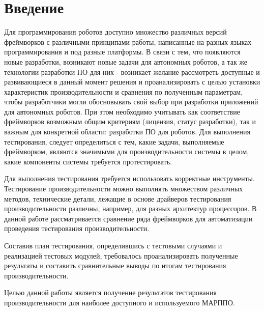 \chapter*{Введение}

Для программирования роботов доступно множество различных версий фреймворков с различными принципами работы, написанные на разных языках программирования и под разные платформы. В связи с тем, что появляются новые разработки, возникают новые задачи для автономных роботов, а так же технологии разработки ПО для них - возникает желание рассмотреть доступные и развивающиеся в данный момент решения и проанализировать с целью установки характеристик производительности и сравнения по полученным параметрам, чтобы разработчики могли обосновывать свой выбор при разработки приложений для автономных роботов. При этом необходимо учитывать как соответствие фреймворков возможным общим критериям (лицензия, статус разработки), так и важным для конкретной области: разработки ПО для роботов. Для выполнения тестирования, следует определиться с тем, какие задачи, выполняемые фреймворком, являются значимыми для производительности системы в целом, какие компоненты системы требуется протестировать.

Для выполнения тестирования требуется использовать корректные инструменты. Тестирование производительности можно выполнять множеством различных методов, технические детали, лежащие в основе драйверов тестирования производительности различны, например, для разных архитектур процессоров. В данной работе рассматривается сравнение ряда фреймворков для автоматизации проведения тестирования производительности.

Составив план тестирования, определившись с тестовыми случаями и реализацией тестовых модулей, требовалось проанализировать полученные результаты и составить сравнительные выводы по итогам тестирования производительности.

Целью данной работы является получение результатов тестирования производительности для наиболее доступного и используемого МАРППО.